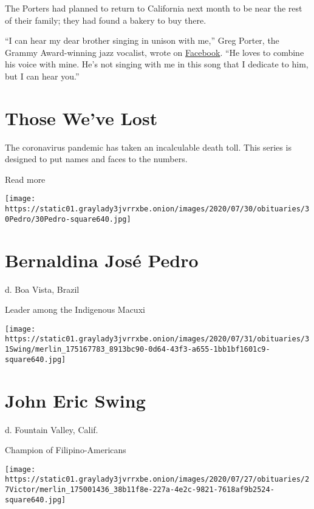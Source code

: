 The Porters had planned to return to California next month to be near
the rest of their family; they had found a bakery to buy there.

``I can hear my dear brother singing in unison with me,'' Greg Porter,
the Grammy Award-winning jazz vocalist, wrote on
\href{https://www.facebookcorewwwi.onion/gregoryportermusic/posts/3090807907636078}{Facebook}.
``He loves to combine his voice with mine. He's not singing with me in
this song that I dedicate to him, but I can hear you.''

\href{https://www.nytimes3xbfgragh.onion/interactive/2020/obituaries/people-died-coronavirus-obituaries.html?action=click\&pgtype=Article\&state=default\&region=BELOW_MAIN_CONTENT\&context=covid_obits_promo}{}

\hypertarget{those-weve-lost}{%
\section{Those We've Lost}\label{those-weve-lost}}

The coronavirus pandemic has taken an incalculable death toll. This
series is designed to put names and faces to the numbers.

Read more

\texttt{[image: https://static01.graylady3jvrrxbe.onion/images/2020/07/30/obituaries/30Pedro/30Pedro-square640.jpg]}

\hypertarget{bernaldina-josuxe9-pedro}{%
\section{Bernaldina José Pedro}\label{bernaldina-josuxe9-pedro}}

d. Boa Vista, Brazil

Leader among the Indigenous Macuxi

\texttt{[image: https://static01.graylady3jvrrxbe.onion/images/2020/07/31/obituaries/31Swing/merlin\_175167783\_8913bc90-0d64-43f3-a655-1bb1bf1601c9-square640.jpg]}

\hypertarget{john-eric-swing}{%
\section{John Eric Swing}\label{john-eric-swing}}

d. Fountain Valley, Calif.

Champion of Filipino-Americans

\texttt{[image: https://static01.graylady3jvrrxbe.onion/images/2020/07/27/obituaries/27Victor/merlin\_175001436\_38b11f8e-227a-4e2c-9821-7618af9b2524-square640.jpg]}


